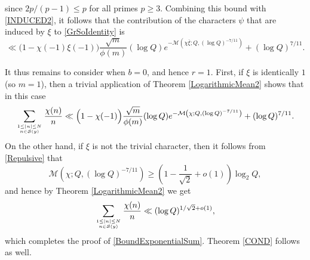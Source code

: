 \documentclass[12pt]{amsart}
\theoremstyle{definition}
\numberwithin{equation}{section}
\newcommand{\mc}{\mathcal}
\renewcommand{\bar}{\overline}
\begin{document}
since $2p/(p-1)\leq p$ for all primes $p\geq 3$. Combining this bound with  \eqref{INDUCED2}, it follows that the contribution of the characters $\psi$ that are induced by $\xi$ to \eqref{GrSoIdentity} is
$$\ll \Big(1-\chi(-1)\xi(-1)\Big)\frac{\sqrt{m}}{\phi(m)}(\log Q) e^{-\mc{M}\left(\chi\bar{\xi};Q, (\log Q)^{-7/11}\right)}+(\log Q)^{7/11}. $$

It thus remains to consider when $b = 0$, and hence $r = 1$. First, if $\xi$ is identically $1$ (so $m=1$), then a trivial application of Theorem \ref{LogarithmicMean2} shows that in this case
\begin{equation*}
\sum_{1\leq |n| \leq N \atop n \in \mc{S}(y)} \frac{\chi(n)}{n} \ll \Big(1-\chi(-1)\Big)\frac{\sqrt{m}}{\phi(m)} (\log Q)e^{-\mc{M}\left(\chi; Q,(\log Q)^{-7/11}\right)} + (\log Q)^{7/11}.
\end{equation*}
On the other hand, if $\xi$ is not the trivial character, then it follows from \eqref{Repulsive} that
$$
\mc{M}(\chi; Q,(\log Q)^{-7/11}) \geq \left(1-\frac{1}{\sqrt{2}}+o(1)\right)\log_2 Q,
$$
and hence by Theorem \ref{LogarithmicMean2} we get
$$ 
\sum_{1\leq |n| \leq N \atop n \in \mc{S}(y)} \frac{\chi(n)}{n}\ll (\log Q)^{1/\sqrt{2}+o(1)},
$$
which completes the proof of \eqref{BoundExponentialSum}. Theorem \ref{COND} follows as well.
\end{document}
